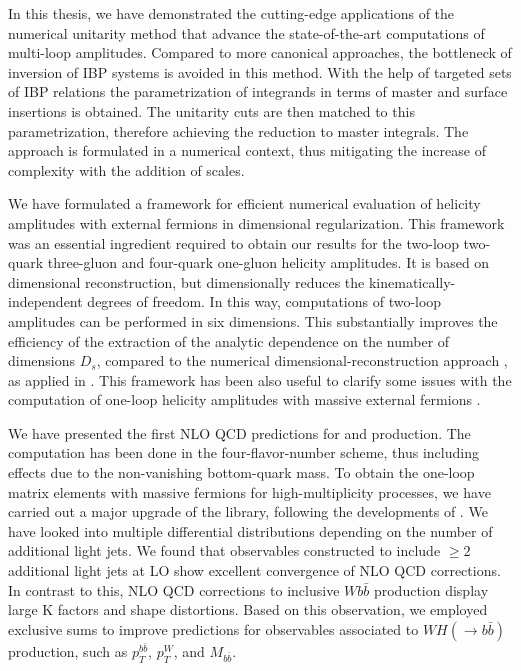 In this thesis, we have demonstrated the cutting-edge applications of the numerical unitarity method \cite{Abreu:2017hqn,Abreu:2017idw,Abreu:2017xsl,Ita:2015tya,Ellis:2008ir,Ellis:2007br,Giele:2008ve}
that advance the state-of-the-art computations of multi-loop amplitudes.
Compared to more canonical approaches, the bottleneck of inversion of IBP systems is avoided in this method.
With the help of targeted sets of IBP relations 
the parametrization of integrands in terms of master and surface insertions is obtained.
The unitarity cuts are then matched to this parametrization, therefore achieving the reduction to master integrals.
The approach is formulated in a numerical context, thus mitigating the increase of complexity with the addition of scales.

We have formulated a framework for efficient numerical evaluation of helicity amplitudes with external fermions in dimensional regularization.
This framework was an essential ingredient required to obtain our results for the two-loop 
two-quark three-gluon and four-quark one-gluon helicity amplitudes.
It is based on dimensional reconstruction, but dimensionally
reduces the kinematically-independent degrees of freedom.
In this way, computations of two-loop amplitudes can be performed in six dimensions.
This substantially improves the efficiency of the extraction of the analytic dependence on the
number of dimensions $D_s$, compared to the numerical dimensional-reconstruction approach \cite{Giele:2008ve,Ellis:2008ir, Boughezal:2011br}, as applied
in \cite{Abreu:2017xsl,Abreu:2017hqn,Badger:2018gip,Abreu:2018jgq}.
This framework has been also useful to clarify some issues with the computation of one-loop helicity amplitudes
with massive external fermions \cite{Anger:2018ove}.

We have presented the first NLO QCD predictions for \Wbbjj{} and \Wbbjjj{} production.
The computation has been done in the four-flavor-number scheme, thus including effects due to the non-vanishing bottom-quark mass.
To obtain the one-loop matrix elements with massive fermions for high-multiplicity processes,
we have carried out a major upgrade of the \BlackHat{} library, following the developments of \cite{Ellis:2008ir}.
We have looked into multiple differential distributions depending on the number of additional light jets.
We found that observables constructed to include $\geq2$ additional light jets at LO
show excellent convergence of NLO QCD corrections.
In contrast to this, NLO QCD corrections to inclusive $Wb\bar{b}$ production display large K factors and shape distortions.
Based on this observation, we employed exclusive sums to improve predictions for observables associated to $WH(\rightarrow b{\bar b})$
production, such as $p_T^{b\bar b}$, $p_T^W$, and $M_{b\bar b}$.


